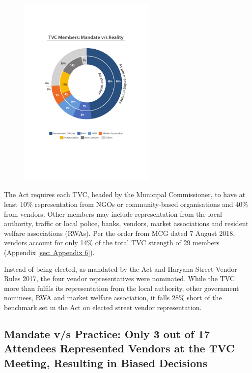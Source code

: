 \documentclass[a4paper, 12pt, twoside]{article}
\begin{document}
{\begin{figure}
\centering
\includegraphics[width=0.6\textwidth]{mandatevsreality.pdf}
\end{figure}

The Act requires each TVC, headed by the Municipal Commissioner, to have at least 10\% representation from NGOs or community-based organisations and 40\% from vendors. Other members may include representation from the local authority, traffic or local police, banks, vendors, market associations and resident welfare associations (RWAs). Per the order from MCG dated 7 August 2018, vendors account for only 14\% of the total TVC strength of 29 members (Appendix \ref{sec: Appendix 6}).

Instead of being elected, as mandated by the Act and Haryana Street Vendor Rules 2017, the four vendor representatives were nominated. While the TVC more than fulfils its representation from the local authority, other government nominees, RWA and market welfare association, it falls 28\% short of the benchmark set in the Act on elected street vendor representation.

\subsection*{Mandate v/s Practice: Only 3 out of 17 Attendees Represented Vendors at the TVC Meeting, Resulting in Biased Decisions}

}
\end{document}
